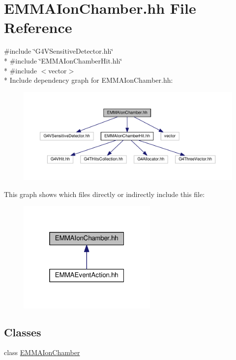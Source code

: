 \hypertarget{EMMAIonChamber_8hh}{}\section{E\+M\+M\+A\+Ion\+Chamber.\+hh File Reference}
\label{EMMAIonChamber_8hh}
{\ttfamily \#include \char`\"{}G4\+V\+Sensitive\+Detector.\+hh\char`\"{}}\\*
{\ttfamily \#include \char`\"{}E\+M\+M\+A\+Ion\+Chamber\+Hit.\+hh\char`\"{}}\\*
{\ttfamily \#include $<$vector$>$}\\*
Include dependency graph for E\+M\+M\+A\+Ion\+Chamber.\+hh\+:
\nopagebreak
\begin{figure}[H]
\begin{center}
\leavevmode
\includegraphics[width=350pt]{EMMAIonChamber_8hh__incl}
\end{center}
\end{figure}
This graph shows which files directly or indirectly include this file\+:
\nopagebreak
\begin{figure}[H]
\begin{center}
\leavevmode
\includegraphics[width=193pt]{EMMAIonChamber_8hh__dep__incl}
\end{center}
\end{figure}
\subsection*{Classes}
\begin{DoxyCompactItemize}
\item 
class \hyperlink{classEMMAIonChamber}{E\+M\+M\+A\+Ion\+Chamber}
\end{DoxyCompactItemize}
